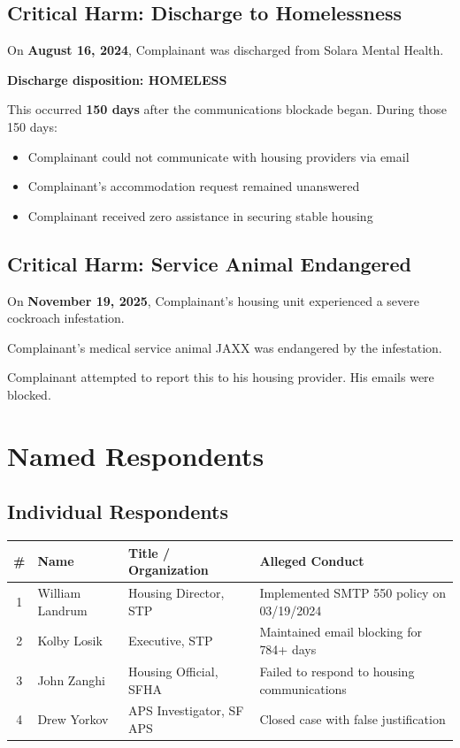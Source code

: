 \documentclass[12pt,letterpaper]{article}
\begin{document}
\subsection{Critical Harm: Discharge to Homelessness}

On \textbf{August 16, 2024}, Complainant was discharged from Solara Mental Health.

\textbf{Discharge disposition: HOMELESS}

This occurred \textbf{150 days} after the communications blockade began. During those 150 days:
\begin{itemize}[noitemsep]
    \item Complainant could not communicate with housing providers via email
    \item Complainant's accommodation request remained unanswered
    \item Complainant received zero assistance in securing stable housing
\end{itemize}

\subsection{Critical Harm: Service Animal Endangered}

On \textbf{November 19, 2025}, Complainant's housing unit experienced a severe cockroach infestation.

Complainant's medical service animal JAXX was endangered by the infestation.

Complainant attempted to report this to his housing provider. His emails were blocked.

\newpage

\section{Named Respondents}

\subsection{Individual Respondents}

\begin{center}
\begin{longtable}{clll}
\toprule
\textbf{\#} & \textbf{Name} & \textbf{Title / Organization} & \textbf{Alleged Conduct} \\
\midrule
\endhead
1 & William Landrum & Housing Director, STP & Implemented SMTP 550 policy on 03/19/2024 \\
2 & Kolby Losik & Executive, STP & Maintained email blocking for 784+ days \\
3 & John Zanghi & Housing Official, SFHA & Failed to respond to housing communications \\
4 & Drew Yorkov & APS Investigator, SF APS & Closed case with false justification \\
\bottomrule
\end{longtable}
\end{center}
\end{document}
